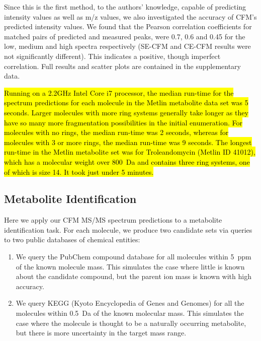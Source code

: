 Since this is the first method, to the authors' knowledge, capable of predicting intensity values as well as m/z values, we also investigated the accuracy of CFM's predicted intensity values. We found that the Pearson correlation coefficients for matched pairs of predicted and measured peaks, were 0.7, 0.6 and 0.45 for the low, medium and high spectra respectively (SE-CFM and CE-CFM results were not significantly different). This indicates a positive, though imperfect correlation. Full results and scatter plots are contained in the supplementary data.

\hl{Running on a 2.2GHz Intel Core i7 processor, the median run-time for the spectrum predictions for each molecule in the Metlin metabolite data set was 5 seconds. Larger molecules with more ring systems generally take longer as they have so many more fragmentation possibilities in the initial enumeration. For molecules with no rings, the median run-time was 2 seconds, whereas for molecules with 3 or more rings, the median run-time was 9 seconds. The longest run-time in the Metlin metabolite set was for Troleandomycin (Metlin ID 41012), which has a molecular weight over 800~Da and contains three ring systems, one of which is size 14. It took just under 5 minutes.}

\subsection{Metabolite Identification}
\label{sec:MetabId}

Here we apply our CFM MS/MS spectrum predictions to a metabolite identification task. 
For each molecule, we produce two candidate sets via queries to two public databases of chemical entities:
\begin{enumerate}
\item We query the PubChem compound database \citep{Bolton2008} for all molecules within 5~ppm of the known molecule mass. This simulates the case where little is known about the candidate compound, but the parent ion mass is known with high accuracy.
\item We query KEGG (Kyoto Encyclopedia of Genes and Genomes) \citep{Kanehisa2006} for all the molecules within 0.5~Da of the known molecular mass. This simulates the case where the molecule is thought to be a naturally occurring metabolite, but there is more uncertainty in the target mass range.
\end{enumerate} 

